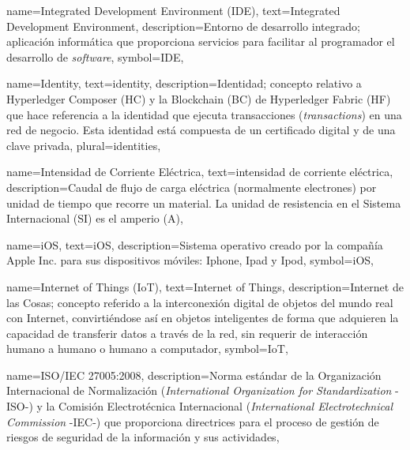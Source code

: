 {
    name={Integrated Development Environment (IDE)},
    text={Integrated Development Environment},
    description={Entorno de desarrollo integrado; aplicación informática que proporciona servicios para facilitar al programador el desarrollo de \textit{software}},
    symbol={IDE},
}

{
    name={Identity},
    text={identity},
    description={Identidad; concepto relativo a Hyperledger Composer (HC) y la Blockchain (BC) de Hyperledger Fabric (HF) que hace referencia a la identidad que ejecuta transacciones (\textit{transactions}) en una red de negocio. Esta identidad está compuesta de un certificado digital y de una clave privada},
    plural={identities},
}
	
{
    name={Intensidad de Corriente Eléctrica},
    text={intensidad de corriente eléctrica},
    description={Caudal de flujo de carga eléctrica (normalmente electrones) por unidad de tiempo que recorre un material. La unidad de resistencia en el Sistema Internacional (SI) es el amperio (A)},
}

{
    name={iOS},
    text={iOS},
    description={Sistema operativo creado por la compañía Apple Inc. para sus dispositivos móviles: Iphone, Ipad y Ipod},
    symbol={iOS},
} 
  	  
{
    name={Internet of Things (IoT)},
    text={Internet of Things},
    description={Internet de las Cosas; concepto referido a la interconexión digital de objetos del mundo real con Internet, convirtiéndose así en objetos inteligentes de forma que adquieren la capacidad de transferir datos a través de la red, sin requerir de interacción humano a humano o humano a computador},
    symbol={IoT},
}
  
{
    name={ISO/IEC 27005:2008},
    description={Norma estándar de la Organización Internacional de Normalización (\textit{International Organization for Standardization} -ISO-) y la Comisión Electrotécnica Internacional (\textit{International Electrotechnical Commission} -IEC-) que proporciona directrices para el proceso de gestión de riesgos de seguridad de la información y sus actividades},
}

